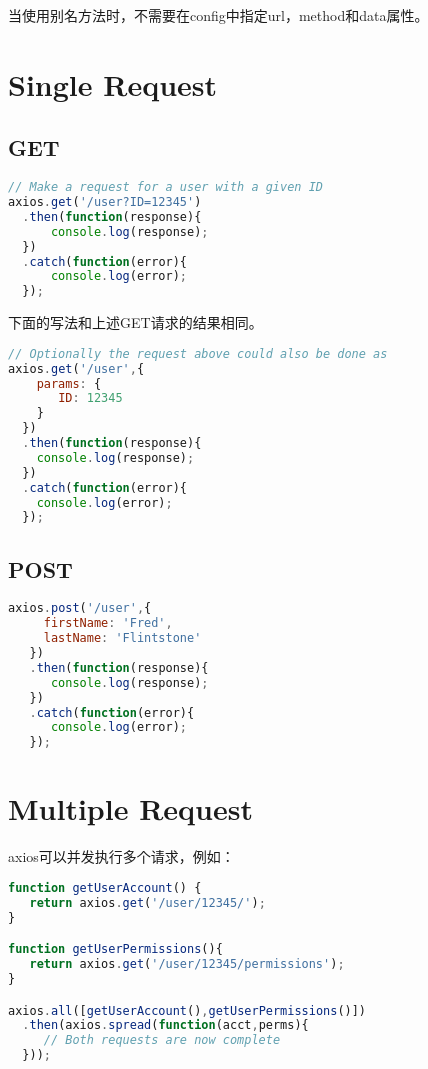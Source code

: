 当使用别名方法时，不需要在config中指定url，method和data属性。





\section{Single Request}


\subsection{GET}



\begin{lstlisting}[language=JavaScript]
// Make a request for a user with a given ID
axios.get('/user?ID=12345')
  .then(function(response){
      console.log(response);
  })
  .catch(function(error){
      console.log(error);
  });
\end{lstlisting}


下面的写法和上述GET请求的结果相同。



\begin{lstlisting}[language=JavaScript]
// Optionally the request above could also be done as
axios.get('/user',{
    params: {
       ID: 12345
    }
  })
  .then(function(response){
    console.log(response);
  })
  .catch(function(error){
    console.log(error);
  });
\end{lstlisting}


\subsection{POST}


\begin{lstlisting}[language=JavaScript]
axios.post('/user',{
     firstName: 'Fred',
     lastName: 'Flintstone'
   })
   .then(function(response){
      console.log(response);
   })
   .catch(function(error){
      console.log(error);
   });
\end{lstlisting}

\section{Multiple Request}


axios可以并发执行多个请求，例如：

\begin{lstlisting}[language=JavaScript]
function getUserAccount() {
   return axios.get('/user/12345/');
}

function getUserPermissions(){
   return axios.get('/user/12345/permissions');
}

axios.all([getUserAccount(),getUserPermissions()])
  .then(axios.spread(function(acct,perms){
     // Both requests are now complete
  }));
\end{lstlisting}





